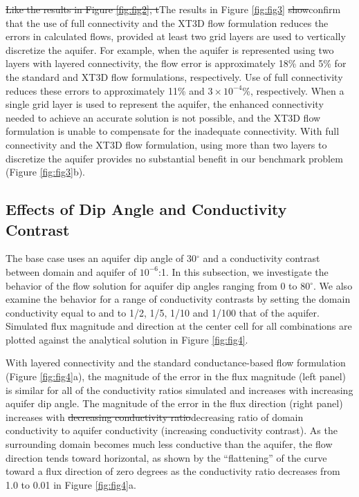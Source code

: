 \documentclass{article}
\begin{document}
{\color{red} \sout{Like the results in Figure \ref{fig:fig2}, t}T}he results in Figure \ref{fig:fig3} {\color{red} \sout{show}confirm} that the use of full connectivity and the XT3D flow formulation reduces the errors in calculated flows, provided at least two grid layers are used to vertically discretize the aquifer. {\color{red}For example, when the aquifer is represented using two layers with layered connectivity, the flow error is approximately 18\% and 5\% for the standard and XT3D flow formulations, respectively. Use of full connectivity reduces these errors to approximately 11\% and $3 \times 10^{-4}$\%, respectively.} When a single grid layer is used to represent the aquifer, the enhanced connectivity needed to achieve an accurate solution is not possible, and the XT3D flow formulation is unable to compensate for the inadequate connectivity. {\color{red} With full connectivity and the XT3D flow formulation, using more than two layers to discretize the aquifer provides no substantial benefit in our benchmark problem (Figure \ref{fig:fig3}b).}

\subsection*{Effects of Dip Angle and Conductivity Contrast}

The base case uses an aquifer dip angle of 30$^{\circ}$ and a conductivity contrast between domain and aquifer of $10^{-6}$:1. In this subsection, we investigate the behavior of the flow solution for aquifer dip angles ranging from 0 to 80$^{\circ}$. We also examine the behavior for a range of conductivity contrasts by setting the domain conductivity {\color{red}equal to and} to 1/2, 1/5, 1/10 and 1/100 that of the aquifer. Simulated flux magnitude and direction at the center cell for all combinations are plotted against the analytical solution in Figure \ref{fig:fig4}. 

With layered connectivity and the standard conductance-based flow formulation (Figure \ref{fig:fig4}a), the magnitude of the error in the flux magnitude (left panel) is similar for all of the conductivity ratios simulated and increases with increasing aquifer dip angle. The magnitude of the error in the flux direction (right panel) increases with {\color{red} \sout{decreasing conductivity ratio}decreasing ratio of domain conductivity to aquifer conductivity (increasing conductivity contrast)}. As the surrounding domain becomes much less conductive than the aquifer, the flow direction tends toward horizontal{\color{red}, as shown by the ``flattening'' of the curve toward a flux direction of zero degrees as the conductivity ratio decreases from 1.0 to 0.01 in Figure \ref{fig:fig4}a}.
\end{document}
